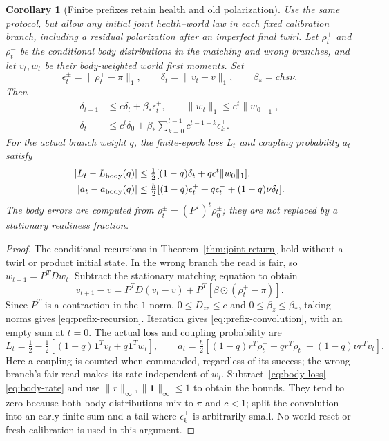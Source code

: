 \documentclass[11pt,a4paper]{article}
\newtheorem{corollary}[proposition]{Corollary}
\begin{document}
\begin{corollary}[Finite prefixes retain health and old polarization]
\label{cor:joint-prefix}
Use the same protocol, but allow any initial joint health--world law
in each fixed calibration branch, including a residual polarization
after an imperfect final twirl. Let $\rho_t^+$ and $\rho_t^-$ be the
conditional body distributions in the matching and wrong branches,
and let $v_t,w_t$ be their body-weighted world first moments.
Set
\[
 \epsilon_t^\pm=\|\rho_t^\pm-\pi\|_1,\qquad
 \delta_t=\|v_t-v\|_1,\qquad \beta_*=chs\nu.
\]
Then
\begin{align}
 \delta_{t+1}&\le c\delta_t+\beta_*\epsilon_t^+,
 \qquad \|w_t\|_1\le c^t\|w_0\|_1,\label{eq:prefix-recursion}\\
 \delta_t&\le c^t\delta_0+
 \beta_*\sum_{k=0}^{t-1}c^{t-1-k}\epsilon_k^+.
 \label{eq:prefix-convolution}
\end{align}
For the actual branch weight $q$, the finite-epoch loss $L_t$ and
coupling probability $a_t$ satisfy
\begin{align}
 |L_t-L_{\rm body}(q)|
 &\le\tfrac12[(1-q)\delta_t+q c^t\|w_0\|_1],
 \label{eq:prefix-loss}\\
 |a_t-a_{\rm body}(q)|
 &\le\tfrac h2[(1-q)\epsilon_t^++q\epsilon_t^-
                 +(1-q)\nu\delta_t].\label{eq:prefix-source}
\end{align}
The body errors are computed from $\rho_t^\pm=(P^T)^t\rho_0^\pm$;
they are not replaced by a stationary readiness fraction.
\end{corollary}
\begin{proof}
The conditional recursions in Theorem~\ref{thm:joint-return} hold
without a twirl or product initial state. In the wrong branch the
read is fair, so $w_{t+1}=P^TDw_t$. Subtract the stationary matching
equation to obtain
\[
 v_{t+1}-v=P^TD(v_t-v)
                 +P^T[\beta\odot(\rho_t^+-\pi)].
\]
Since $P^T$ is a contraction in the $1$-norm, $0\le D_{zz}\le c$
and $0\le\beta_z\le\beta_*$, taking norms gives
\eqref{eq:prefix-recursion}. Iteration gives
\eqref{eq:prefix-convolution}, with an empty sum at $t=0$.
The actual loss and coupling probability are
\[
 L_t=\tfrac12-\tfrac12[(1-q)\mathbf1^Tv_t+q\mathbf1^Tw_t],
 \qquad
 a_t=\tfrac h2[(1-q)r^T\rho_t^++q r^T\rho_t^-
                        -(1-q)\nu r^Tv_t].
\]
Here a coupling is counted when commanded, regardless of its
success; the wrong branch's fair read makes its rate independent
of $w_t$. Subtract~\eqref{eq:body-loss}--\eqref{eq:body-rate} and
use $\|r\|_\infty,\|\mathbf1\|_\infty\le1$ to obtain the bounds.
They tend to zero because both body distributions mix to $\pi$
and $c<1$; split the convolution into an early finite sum and a
tail where $\epsilon_k^+$ is arbitrarily small. No world reset or
fresh calibration is used in this argument.
\end{proof}
\end{document}
